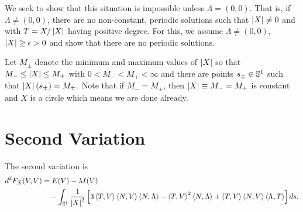 \documentclass[12pt]{article}
\begin{document}
We seek to show that this situation is impossible unless \(\Lambda = (0, 0)\). That is, if \(\Lambda \ne (0, 0)\), there are no non-constant, periodic solutions such that \(\left|{X}\right| \ne 0\) and with \(T = X/\left|{X}\right|\) having positive degree. For this, we assume \(\Lambda \ne (0, 0)\), \(\left|{X}\right| \geq \epsilon > 0\) and show that there are no periodic solutions.

Let \(M_{\pm}\) denote the minimum and maximum values of \(\left|{X}\right|\) so that \(M_- \leq \left|{X}\right| \leq M_+\) with \(0 < M_- < M_+ < \infty\) and there are points \(s_{\pm} \in \operatorname{\mathbb{S}^1}\) such that \(\left|{X}\right|(s_{\pm}) = M_{\pm}\). Note that if \(M_- = M_+\), then \(\left|{X}\right| \equiv M_- = M_+\) is constant and \(X\) is a circle which means we are done already. 


\section{Second Variation}

\begin{lem}
The second variation is
\[
\begin{split}
d^2F_X (V, V) &= E(V) - \lambda I(V) \\
&\quad - \int_{\operatorname{\mathbb{S}^1}} \frac{1}{\left|{X}\right|^2} \left[3\left\langle{T},{V}\right\rangle\left\langle{N},{V}\right\rangle \left\langle{N},{\Lambda}\right\rangle - \left\langle{T},{V}\right\rangle^2 \left\langle{N},{\Lambda}\right\rangle + \left\langle{T},{V}\right\rangle\left\langle{N},{V}\right\rangle \left\langle{\Lambda},{T}\right\rangle \right] ds.
\end{split}
\]
\end{lem}
\end{document}
